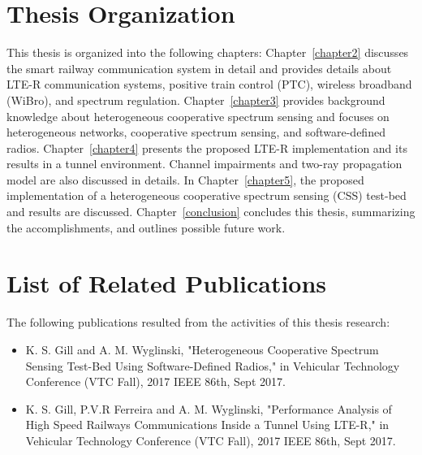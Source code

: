 \section{Thesis Organization}
This thesis is organized into the following chapters: Chapter~\ref{chapter2} discusses the smart railway communication system in detail and provides details about LTE-R communication systems, positive train control (PTC), wireless broadband (WiBro), and spectrum regulation. Chapter~\ref{chapter3} provides background knowledge about heterogeneous cooperative spectrum sensing and focuses on heterogeneous networks, cooperative spectrum sensing, and software-defined radios. Chapter~\ref{chapter4} presents the proposed LTE-R implementation and its results in a tunnel environment. Channel impairments and two-ray propagation model are also discussed in details.  In Chapter~\ref{chapter5}, the proposed implementation of a heterogeneous cooperative spectrum sensing (CSS) test-bed and results are discussed. Chapter~\ref{conclusion} concludes this thesis, summarizing the accomplishments, and outlines possible future work.

\section{List of Related Publications}
The following publications resulted from the activities of this thesis research:
\begin{itemize}
\item K. S. Gill and A. M. Wyglinski, "Heterogeneous Cooperative Spectrum Sensing
Test-Bed Using Software-Defined Radios," in Vehicular Technology Conference (VTC Fall), 2017 IEEE 86th, Sept 2017.

\item K. S. Gill, P.V.R Ferreira and A. M. Wyglinski, "Performance Analysis of High Speed Railways Communications Inside a Tunnel Using LTE-R," in Vehicular Technology Conference (VTC Fall), 2017 IEEE 86th, Sept 2017.

\end{itemize}


